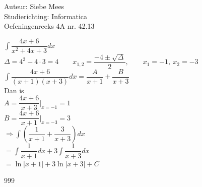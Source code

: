 \documentclass[a4paper]{article}
\begin{document}
  
\noindent \large Auteur: Siebe Mees \\
\noindent \large Studierichting: Informatica\\
\noindent \large Oefeningenreeks 4A nr. 42.13\\

\medskip

\normalsize

$ \displaystyle\int \dfrac{4x+6}{x^2+4x+3}dx $\\

$ \Delta =4^2-4\cdot 3=4 \qquad x_{1,2}=\dfrac{-4\pm \sqrt{\Delta}}{2}, \qquad x_1=-1,\ x_2=-3 $\\

$ \displaystyle\int \dfrac{4x+6}{(x+1)(x+3)}dx =\dfrac{A}{x+1}+\dfrac{B}{x+3} $\\

Dan is \\
 
$ A=\dfrac{4x+6}{x+3}\bigg|_{x=-1}=1 $\\

$ B=\dfrac{4x+6}{x+1}\bigg|_{x=-3}=3 $\\

$ \Rightarrow \displaystyle\int \left( \dfrac{1}{x+1}+\dfrac{3}{x+3} \right)dx $\\

$ =\displaystyle\int \dfrac{1}{x+1}dx+3\displaystyle\int \dfrac{1}{x+3}dx $\\

$ =\ln|x+1|+3\ln|x+3|+C $\\

\begin{thebibliography}{999}
\end{thebibliography}
\end{document}
